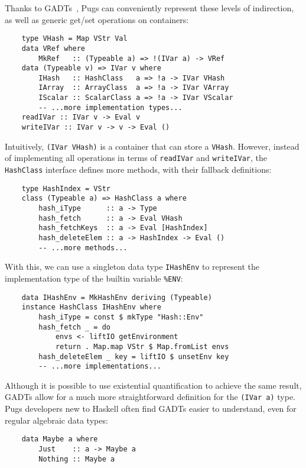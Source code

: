 \documentclass[]{sigplanconf}
\newcommand{\code}[1]{\texttt{#1}}
\begin{document}
Thanks to GADTs~\cite{Jones}, Pugs can conveniently represent these levels of
indirection, as well as generic get/set operations on containers:

\begin{lstlisting}
    type VHash = Map VStr Val
    data VRef where
        MkRef   :: (Typeable a) => !(IVar a) -> VRef
    data (Typeable v) => IVar v where
        IHash   :: HashClass   a => !a -> IVar VHash
        IArray  :: ArrayClass  a => !a -> IVar VArray
        IScalar :: ScalarClass a => !a -> IVar VScalar
        -- ...more implementation types...
    readIVar :: IVar v -> Eval v
    writeIVar :: IVar v -> v -> Eval ()
\end{lstlisting}

Intuitively, \code{(IVar VHash)} is a container that can store a \code{VHash}.
However, instead of implementing all operations in terms of \code{readIVar} and
\code{writeIVar}, the \code{HashClass} interface defines more methods, with their
fallback definitions:

\begin{lstlisting}
    type HashIndex = VStr
    class (Typeable a) => HashClass a where
        hash_iType      :: a -> Type
        hash_fetch      :: a -> Eval VHash
        hash_fetchKeys  :: a -> Eval [HashIndex]
        hash_deleteElem :: a -> HashIndex -> Eval ()
        -- ...more methods...
\end{lstlisting}

With this, we can use a singleton data type \code{IHashEnv} to represent the
implementation type of the builtin variable \code{\%ENV}:

\begin{lstlisting}
    data IHashEnv = MkHashEnv deriving (Typeable)
    instance HashClass IHashEnv where
        hash_iType = const $ mkType "Hash::Env"
        hash_fetch _ = do
            envs <- liftIO getEnvironment
            return . Map.map VStr $ Map.fromList envs
        hash_deleteElem _ key = liftIO $ unsetEnv key
        -- ...more implementations...
\end{lstlisting}

Although it is possible to use existential quantification to achieve the same
result, GADTs allow for a much more straightforward definition for the
\code{(IVar a)} type.  Pugs developers new to Haskell often find GADTs easier
to understand, even for regular algebraic data types:

\begin{lstlisting}
    data Maybe a where
        Just    :: a -> Maybe a
        Nothing :: Maybe a
\end{lstlisting}
\end{document}

